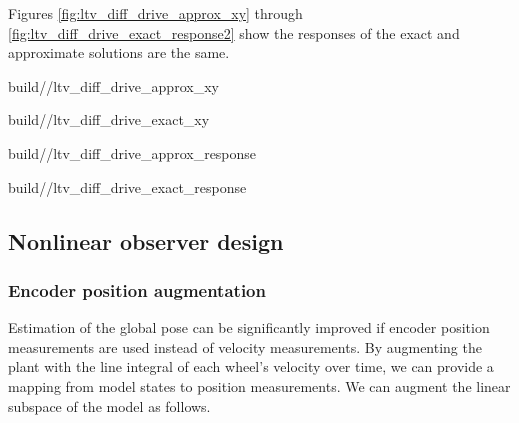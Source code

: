 Figures \ref{fig:ltv_diff_drive_approx_xy} through
\ref{fig:ltv_diff_drive_exact_response2} show the responses of the exact
and approximate solutions are the same.
\begin{bookfigure}
  \begin{minisvg}{2}{build/\chapterpath/ltv_diff_drive_approx_xy}
    \caption{Linear time-varying differential drive controller x-y plot
      (approximate)}
    \label{fig:ltv_diff_drive_approx_xy}
  \end{minisvg}
  \hfill
  \begin{minisvg}{2}{build/\chapterpath/ltv_diff_drive_exact_xy}
    \caption{Linear time-varying differential drive controller x-y plot (exact)}
  \end{minisvg}
  \hfill
  \begin{minisvg}{2}{build/\chapterpath/ltv_diff_drive_approx_response}
    \caption{Linear time-varying differential drive controller response
      (approximate)}
  \end{minisvg}
  \hfill
  \begin{minisvg}{2}{build/\chapterpath/ltv_diff_drive_exact_response}
    \caption{Linear time-varying differential drive controller response (exact)}
    \label{fig:ltv_diff_drive_exact_response2}
  \end{minisvg}
\end{bookfigure}

\subsection{Nonlinear observer design}

\subsubsection{Encoder position augmentation}

Estimation of the global pose can be significantly improved if encoder position
measurements are used instead of velocity measurements. By augmenting the plant
with the line integral of each wheel's velocity over time, we can provide a
mapping from model states to position measurements. We can augment the linear
subspace of the model as follows.

